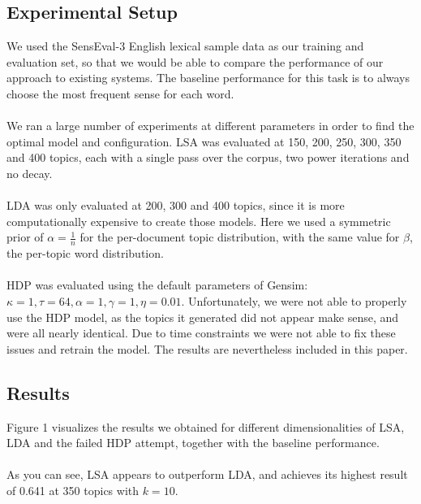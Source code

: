 \subsection{Experimental Setup}
We used the SensEval-3 English lexical sample data as our training and evaluation set, so that we would be able to compare the performance of our approach to existing systems. The baseline performance for this task is to always choose the most frequent sense for each word.\\\\
We ran a large number of experiments at different parameters in order to find the optimal model and configuration. LSA was evaluated at 150, 200, 250, 300, 350 and 400 topics, each with a single pass over the corpus, two power iterations and no decay.\\\\
LDA was only evaluated at 200, 300 and 400 topics, since it is more computationally expensive to create those models. Here we used a symmetric prior of $\alpha = \frac{1}{n}$ for the per-document topic distribution, with the same value for $\beta$, the per-topic word distribution.\\\\
HDP was evaluated using the default parameters of Gensim: $\kappa = 1, \tau = 64, \alpha =1, \gamma =1, \eta =0.01$. Unfortunately, we were not able to properly use the HDP model, as the topics it generated did not appear make sense, and were all nearly identical. Due to time constraints we were not able to fix these issues and retrain the model. The results are nevertheless included in this paper.\\
\subsection{Results}
Figure 1 visualizes the results we obtained for different dimensionalities of LSA, LDA and the failed HDP attempt, together with the baseline performance. \\\\
As you can see, LSA appears to outperform LDA, and achieves its highest result of 0.641 at 350 topics with $k=10$.


